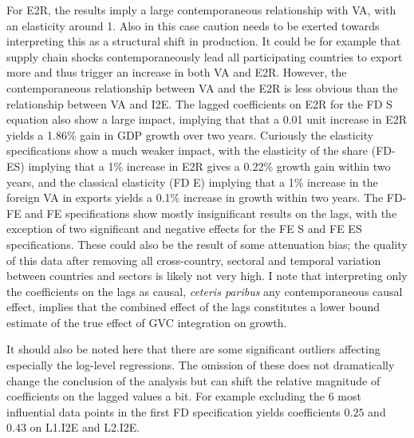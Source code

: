 \documentclass[a4paper]{article}
\begin{document}


For E2R, the results imply a large contemporaneous relationship with VA, with an elasticity around 1. Also in this case caution needs to be exerted towards interpreting this as a structural shift in production. It could be for example that supply chain shocks contemporaneously lead all participating countries to export more and thus trigger an increase in both VA and E2R. However, the contemporaneous relationship between VA and the E2R is less obvious than the relationship between VA and I2E. The lagged coefficients on E2R for the FD S equation also show a large impact, implying that that a 0.01 unit increase in E2R yields a 1.86\% gain in GDP growth over two years. Curiously the elasticity specifications show a much weaker impact, with the elasticity of the share (FD-ES) implying that a 1\% increase in E2R gives a 0.22\% growth gain within two years, and the classical elasticity (FD E) implying that a 1\% increase in the foreign VA in exports yields a 0.1\% increase in growth within two years. The FD-FE and FE specifications show mostly insignificant results on the lags, with the exception of two significant and negative effects for the FE S and FE ES specifications. These could also be the result of some attenuation bias; the quality of this data after removing all cross-country, sectoral and temporal variation between countries and sectors is likely not very high.  I note that interpreting only the coefficients on the lags as causal, \textit{ceteris paribus} any contemporaneous causal effect, implies that the combined effect of the lags constitutes a lower bound estimate of the true effect of GVC integration on growth.  %

It should also be noted here that there are some significant outliers affecting especially the log-level regressions. The omission of these does not dramatically change the conclusion of the analysis but can shift the relative magnitude of coefficients on the lagged values a bit. For example excluding the 6 most influential data points in the first FD specification yields coefficients $0.25$ and $0.43$ on L1.I2E and L2.I2E. \newline 
\end{document}
